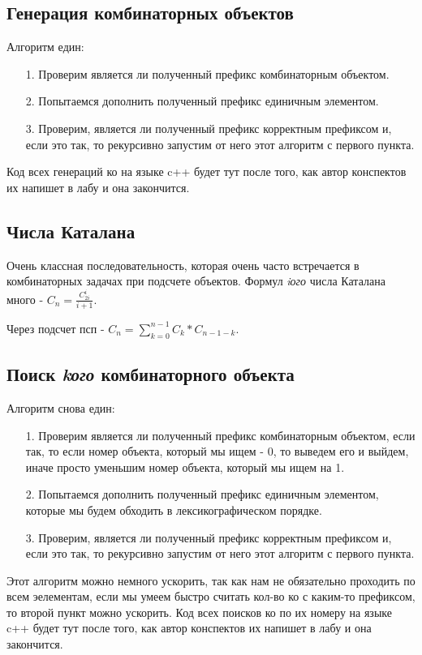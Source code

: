 
\subsection{Генерация комбинаторных объектов}
Алгоритм един:
\begin{enumerate}
    \item[1.] Проверим является ли полученный префикс комбинаторным объектом.
    \item[2.] Попытаемся дополнить полученный префикс единичным элементом.
    \item[3.] Проверим, является ли полученный префикс корректным префиксом и, если это так, то рекурсивно запустим от него этот алгоритм с первого пункта. 
\end{enumerate}
Код всех генераций ко на языке c++ будет тут после того, как автор конспектов их напишет в лабу и она закончится.
\subsection{Числа Каталана}
Очень классная последовательность, которая очень часто встречается в комбинаторных задачах при подсчете объектов. Формул \textit{iого} числа Каталана много - $\displaystyle C_n = \frac{C^i_{2i}}{i+1}$.

Через подсчет псп - $\displaystyle C_n = \sum\limits_{k=0}^{n-1}C_k*C_{n-1-k}$.

\subsection{Поиск \textit{kого} комбинаторного объекта}
Алгоритм снова един:
\begin{enumerate}
    \item[1.] Проверим является ли полученный префикс комбинаторным объектом, если так, то если номер объекта, который мы ищем - 0, то выведем его и выйдем, иначе просто уменьшим номер объекта, который мы ищем на 1.
    \item[2.] Попытаемся дополнить полученный префикс единичным элементом, которые мы будем обходить в лексикографическом порядке.
    \item[3.] Проверим, является ли полученный префикс корректным префиксом и, если это так, то рекурсивно запустим от него этот алгоритм с первого пункта. 
\end{enumerate}
Этот алгоритм можно немного ускорить, так как нам не обязательно проходить по всем эелементам, если мы умеем быстро считать кол-во ко с каким-то префиксом, то второй пункт можно ускорить.
Код всех поисков ко по их номеру на языке c++ будет тут после того, как автор конспектов их напишет в лабу и она закончится.
